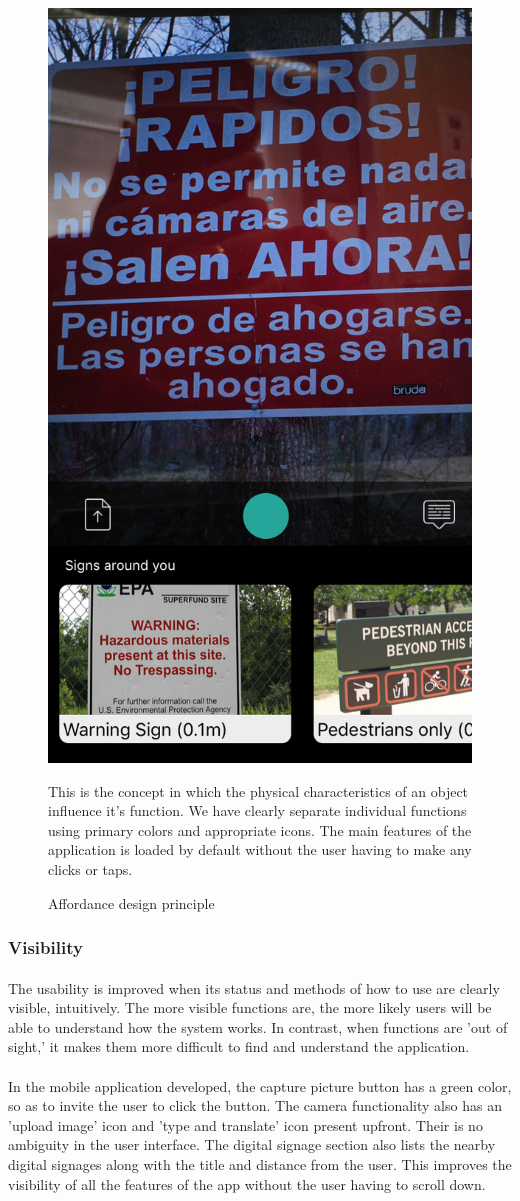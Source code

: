 \documentclass[12pt]{article}
\begin{document}
    
    \begin{figure}[H]
	\centering
	\includegraphics[width=0.5\linewidth]{media/1a.PNG}
	\caption{Affordance design principle}
	\label{fig:affordance}{This is the concept in which the physical characteristics of an object influence it's function. We have clearly separate individual functions using primary colors and appropriate icons. The main features of the application is loaded by default without the user having to make any clicks or taps.}
\end{figure} 

    
    
     \subsubsection{Visibility}
     \paragraph{}The usability is improved when its status and methods of how to use are clearly visible, intuitively. The more visible functions are, the more likely users will be able to understand how the system works.\cite{norman} In contrast, when functions are 'out of sight,' it makes them more difficult to find and understand the application.
     
         \paragraph{} In the mobile application developed, the capture picture button has a green color, so as to invite the user to click the button. The camera functionality also has an 'upload image' icon and 'type and translate' icon present upfront. Their is no ambiguity in the user interface. The digital signage section also lists the nearby digital signages along with the title and distance from the user. This improves the visibility of all the features of the app without the user having to scroll down. 
     
\end{document}
